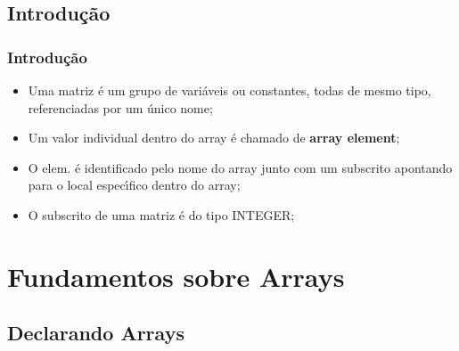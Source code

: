 \documentclass[notes=show]{beamer}
\begin{document}
\subsection{Introdução}
\begin{frame}%

\frametitle{Introdução}

\begin{itemize}
\item Uma matriz \'{e} um grupo de vari\'{a}veis {}{}ou constantes, todas de
mesmo tipo, referenciadas por um \'{u}nico nome;

\item Um valor individual dentro do array \'{e} chamado de \textbf{array
element};

\item O elem. \'{e} identificado pelo nome do array junto com um subscrito
apontando para o local espec\'{\i}fico dentro do array;

\item O subscrito de uma matriz \'{e} do tipo INTEGER;
\end{itemize}

\transboxout%
\end{frame}%

\section{Fundamentos sobre Arrays}

\subsection{Declarando Arrays}
\end{document}
